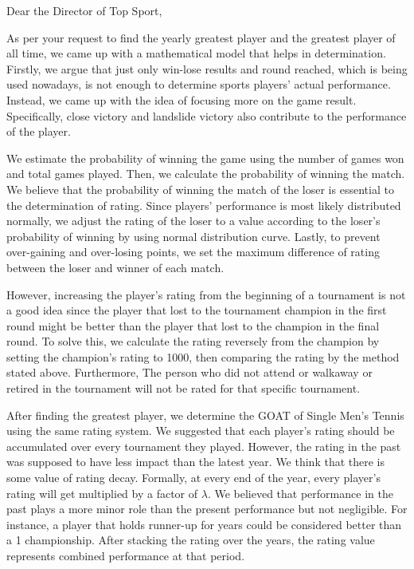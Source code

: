 \noindent Dear the Director of Top Sport, 

As per your request to find the yearly greatest player and the greatest player of all time, we came up with a mathematical model that helps in determination. Firstly, we argue that just only win-lose results and round reached, which is being used nowadays, is not enough to determine sports players' actual performance. Instead, we came up with the idea of focusing more on the game result. Specifically, close victory and landslide victory also contribute to the performance of the player. 

We estimate the probability of winning the game using the number of games won and total games played. Then, we calculate the probability of winning the match. We believe that the probability of winning the match of the loser is essential to the determination of rating. Since players' performance is most likely distributed normally, we adjust the rating of the loser to a value according to the loser’s probability of winning by using normal distribution curve. Lastly, to prevent over-gaining and over-losing points, we set the maximum difference of rating between the loser and winner of each match. 

However, increasing the player's rating from the beginning of a tournament is not a good idea since the player that lost to the tournament champion in the first round might be better than the player that lost to the champion in the final round. To solve this, we calculate the rating reversely from the champion by setting the champion's rating to 1000, then comparing the rating by the method stated above. Furthermore, The person who did not attend or walkaway or retired in the tournament will not be rated for that specific tournament. 

After finding the greatest player, we determine the GOAT of Single Men’s Tennis using the same rating system. We suggested that each player’s rating should be accumulated over every tournament they played. However, the rating in the past was supposed to have less impact than the latest year. We think that there is some value of rating decay. Formally, at every end of the year, every player's rating will get multiplied by a factor of $\lambda$. We believed that performance in the past plays a more minor role than the present performance but not negligible. For instance, a player that holds runner-up for years could be considered better than a 1 championship. After stacking the rating over the years, the rating value represents combined performance at that period. 

